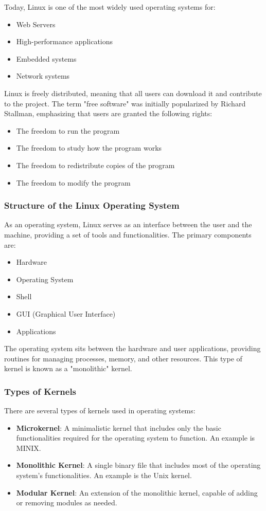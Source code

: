 Today, Linux is one of the most widely used operating systems for:
\begin{itemize}
    \item Web Servers
    \item High-performance applications
    \item Embedded systems
    \item Network systems
\end{itemize}
Linux is freely distributed, meaning that all users can download it and contribute to the project. The term "free software" was initially popularized by Richard Stallman, emphasizing that users are granted the following rights:
\begin{itemize}
    \item The freedom to run the program
    \item The freedom to study how the program works
    \item The freedom to redistribute copies of the program
    \item The freedom to modify the program
\end{itemize}

\subsubsection{Structure of the Linux Operating System}
As an operating system, Linux serves as an interface between the user and the machine, providing a set of tools and functionalities. The primary components are:
\begin{itemize}
    \item Hardware
    \item Operating System
    \item Shell
    \item GUI (Graphical User Interface)
    \item Applications
\end{itemize}
The operating system sits between the hardware and user applications, providing routines for managing processes, memory, and other resources. This type of kernel is known as a "monolithic" kernel.

\subsubsection{Types of Kernels}
There are several types of kernels used in operating systems:
\begin{itemize}
    \item \textbf{Microkernel}: A minimalistic kernel that includes only the basic functionalities required for the operating system to function. An example is MINIX.
    \item \textbf{Monolithic Kernel}: A single binary file that includes most of the operating system's functionalities. An example is the Unix kernel.
    \item \textbf{Modular Kernel}: An extension of the monolithic kernel, capable of adding or removing modules as needed.
\end{itemize}

